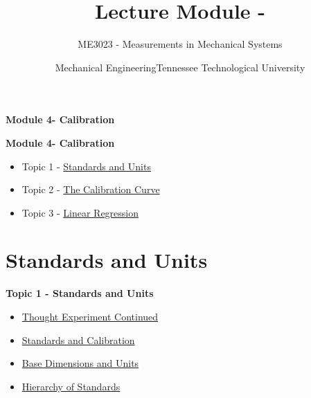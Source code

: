 \documentclass[fleqn]{ltx-talk} %
\author{ME3023 - Measurements in Mechanical Systems}
\title{Lecture Module - \moduletitle}
\date{Mechanical Engineering\vspc Tennessee Technological University}
\newcommand{\MNUM}{4\hspace{2mm}} %
\newcommand{\moduletitle}{Calibration}
\newcommand{\sectionItitle}{Standards and Units}
\newcommand{\sectionIItitle}{The Calibration Curve}
\newcommand{\sectionIIItitle}{Linear Regression}
\newcommand{\sectionIsubsectionItitle}{Thought Experiment Continued}
\newcommand{\sectionIsubsectionIItitle}{Standards and Calibration}
\newcommand{\sectionIsubsectionIIItitle}{Base Dimensions and Units}
\newcommand{\sectionIsubsectionIVtitle}{Hierarchy of Standards}
\begin{document}
	\lstset{language=MATLAB,basicstyle=\ttfamily\small,showstringspaces=false}

        \begin{frame}
	    \begin{framed}\Large \textbf{Module \MNUM - \moduletitle}\end{framed}
        \end{frame}

	\begin{frame} 
		\large \textbf{Module \MNUM - \moduletitle} \vspace{3mm}\\

		\begin{itemize}
			\item Topic 1 - \hyperref[sectionI]{\sectionItitle} \vspc %
			\item Topic 2 - \hyperref[sectionII]{\sectionIItitle} \vspc %
			\item Topic 3 - \hyperref[sectionIII]{\sectionIIItitle} \vspc %
		\end{itemize}

	\end{frame}

	\section{\sectionItitle}\label{sectionI}

		\begin{frame} 
			\large \textbf{Topic 1 - \sectionItitle} \vspace{3mm}\\

			\begin{itemize}
				\item \hyperref[sectionIsubsectionI]{\sectionIsubsectionItitle} \vspc %
				\item \hyperref[sectionIsubsectionII]{\sectionIsubsectionIItitle} \vspc %
				\item \hyperref[sectionIsubsectionIII]{\sectionIsubsectionIIItitle} \vspc %
				\item \hyperref[sectionIsubsectionIV]{\sectionIsubsectionIVtitle} \vspc %
			\end{itemize}
		\end{frame}
		
\end{document}
